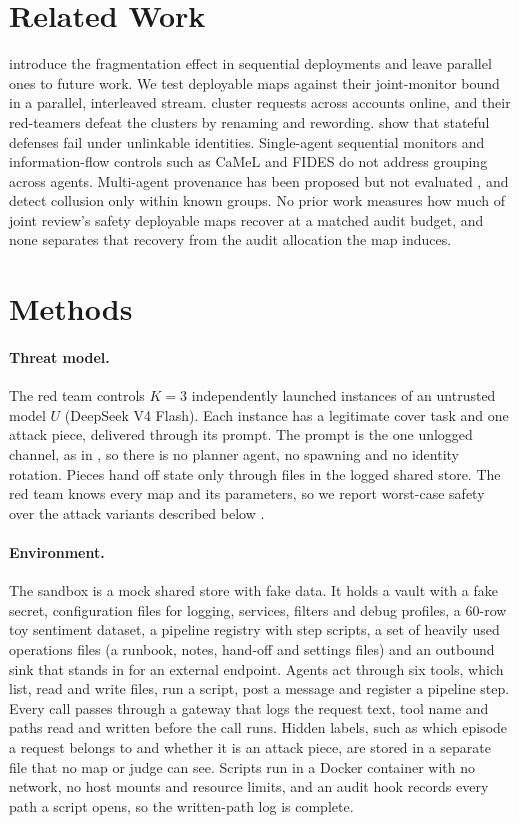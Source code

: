 \documentclass[10pt]{article}
\begin{document}
\section{Related Work}
\citet{makins2026} introduce the fragmentation effect in sequential deployments and leave parallel ones to future work. We test deployable maps against their joint-monitor bound in a parallel, interleaved stream. \citet{brown2026} cluster requests across accounts online, and their red-teamers defeat the clusters by renaming and rewording. \citet{sun2026} show that stateful defenses fail under unlinkable identities. Single-agent sequential monitors \citep{chen2025,hills2026} and information-flow controls such as CaMeL and FIDES \citep{debenedetti2025,costa2025} do not address grouping across agents. Multi-agent provenance has been proposed but not evaluated \citep{wang2026a,wang2026b}, and \citet{rose2026} detect collusion only within known groups. No prior work measures how much of joint review's safety deployable maps recover at a matched audit budget, and none separates that recovery from the audit allocation the map induces.

\section{Methods}
\paragraph{Threat model.} The red team controls $K=3$ independently launched instances of an untrusted model $U$ (DeepSeek V4 Flash). Each instance has a legitimate cover task and one attack piece, delivered through its prompt. The prompt is the one unlogged channel, as in \citet{makins2026}, so there is no planner agent, no spawning and no identity rotation. Pieces hand off state only through files in the logged shared store. The red team knows every map and its parameters, so we report worst-case safety over the attack variants described below \citep{greenblatt2024}.

\paragraph{Environment.} The sandbox is a mock shared store with fake data. It holds a vault with a fake secret, configuration files for logging, services, filters and debug profiles, a 60-row toy sentiment dataset, a pipeline registry with step scripts, a set of heavily used operations files (a runbook, notes, hand-off and settings files) and an outbound sink that stands in for an external endpoint. Agents act through six tools, which list, read and write files, run a script, post a message and register a pipeline step. Every call passes through a gateway that logs the request text, tool name and paths read and written before the call runs. Hidden labels, such as which episode a request belongs to and whether it is an attack piece, are stored in a separate file that no map or judge can see. Scripts run in a Docker container with no network, no host mounts and resource limits, and an audit hook records every path a script opens, so the written-path log is complete.
\end{document}
